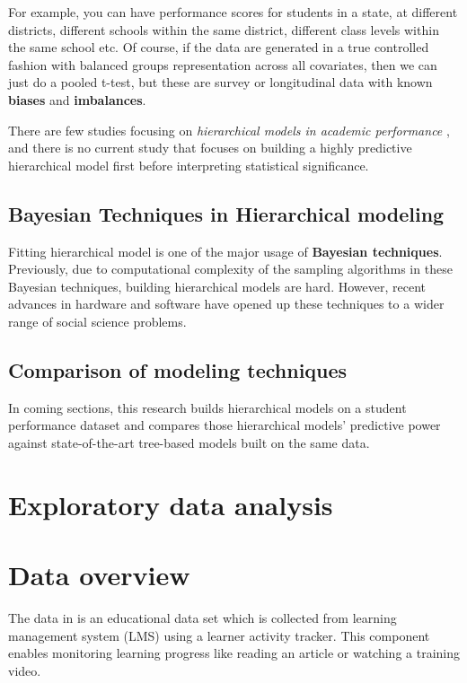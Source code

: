 \documentclass{sigchi}
\begin{document}
For example, you can have performance
scores for students in a
state, at different districts, different schools within the same district, different
class levels within the same school etc. Of course, if the data are generated in
a true controlled fashion with balanced groups representation across all
covariates, then we can just do a pooled t-test, but these are survey or
longitudinal data with known \textbf{biases} and \textbf{imbalances}. \cite{konig2017bayesian}

There are few studies focusing on \textit{hierarchical models in academic performance}
\cite{tsai2015hierarchical, subedi2015measuring}, and there is no current study that focuses
on building a highly predictive hierarchical model first before interpreting
statistical significance.

\subsection{Bayesian Techniques in Hierarchical modeling}
Fitting hierarchical model is one of the
major usage of \textbf{Bayesian techniques}. Previously, due to
computational complexity of the sampling algorithms in these Bayesian techniques, building hierarchical models are hard.
However, recent advances in hardware and software have opened up these techniques to a wider range of social science problems. \cite{carpenter2017stan}

\subsection{Comparison of modeling techniques}
In coming sections, this research builds hierarchical models on a student
performance dataset
and compares those hierarchical models' predictive power against
state-of-the-art tree-based models built on the same data.

\section{Exploratory data analysis}
\section{Data overview}


The data in \cite{amrieh2016mining} is an educational data set which is collected from learning management system (LMS) using a learner activity tracker. This component enables monitoring learning progress like reading an article or watching a training video. 
\end{document}
